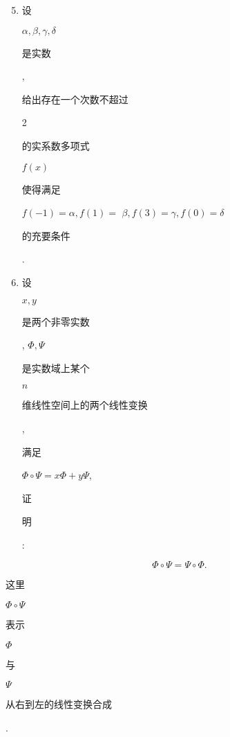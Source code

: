 \documentclass[10pt]{article}
\begin{document}
\begin{enumerate}
  \setcounter{enumi}{4}
  \item \begin{CJK}{UTF8}{mj}设\end{CJK} $\alpha, \beta, \gamma, \delta$ \begin{CJK}{UTF8}{mj}是实数\end{CJK}, \begin{CJK}{UTF8}{mj}给出存在一个次数不超过\end{CJK} 2 \begin{CJK}{UTF8}{mj}的实系数多项式\end{CJK} $f(x)$ \begin{CJK}{UTF8}{mj}使得满足\end{CJK} $f(-1)=\alpha, f(1)=$ $\beta, f(3)=\gamma, f(0)=\delta$ \begin{CJK}{UTF8}{mj}的充要条件\end{CJK}.

  \item \begin{CJK}{UTF8}{mj}设\end{CJK} $x, y$ \begin{CJK}{UTF8}{mj}是两个非零实数\end{CJK}, $\Phi, \Psi$ \begin{CJK}{UTF8}{mj}是实数域上某个\end{CJK} $n$ \begin{CJK}{UTF8}{mj}维线性空间上的两个线性变换\end{CJK}, \begin{CJK}{UTF8}{mj}满足\end{CJK} $\Phi \circ \Psi=x \Phi+y \Psi$, \begin{CJK}{UTF8}{mj}证\end{CJK} \begin{CJK}{UTF8}{mj}明\end{CJK}:

\end{enumerate}
$$
\Phi \circ \Psi=\Psi \circ \Phi .
$$
\begin{CJK}{UTF8}{mj}这里\end{CJK} $\Phi \circ \Psi$ \begin{CJK}{UTF8}{mj}表示\end{CJK} $\Phi$ \begin{CJK}{UTF8}{mj}与\end{CJK} $\Psi$ \begin{CJK}{UTF8}{mj}从右到左的线性变换合成\end{CJK}.
\end{document}

